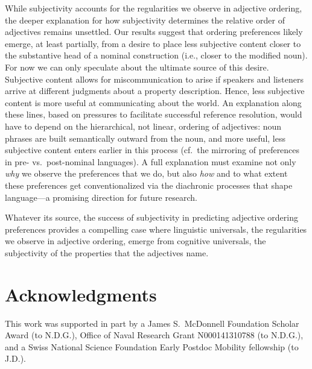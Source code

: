 \documentclass[manuscript]{stjour}
\begin{document}
While subjectivity accounts for the regularities we observe in adjective ordering, the deeper explanation for how subjectivity determines the relative order of adjectives remains unsettled. Our results suggest that ordering preferences likely emerge, at least partially, from a desire to place less subjective content closer to the substantive head of a nominal construction (i.e., closer to the modified noun). 
For now we can only speculate about the ultimate source of this desire. Subjective content allows for miscommunication to arise if speakers and listeners arrive at different judgments about a property description. Hence, less subjective content is more useful at communicating about the world. 
An explanation along these lines, based on pressures to facilitate successful reference resolution, would have to depend on the hierarchical, not linear, ordering of adjectives: noun phrases are built semantically outward from the noun, and more useful, less subjective content enters earlier in this process (cf.~the mirroring of preferences in pre- vs.~post-nominal languages). A full explanation must examine not only \emph{why} we observe the preferences that we do, but also \emph{how} and to what extent these preferences get conventionalized via the diachronic processes that shape language---a promising direction for future research. %

Whatever its source, the success of subjectivity in predicting adjective ordering preferences provides a compelling case where linguistic universals, the regularities we observe in adjective ordering, emerge from cognitive universals, the subjectivity of the properties that the adjectives name.


\section*{Acknowledgments}
This work was supported in part by a James S.~McDonnell Foundation Scholar Award (to N.D.G.), Office of Naval Research Grant N000141310788 (to N.D.G.), and a Swiss National Science Foundation Early Postdoc Mobility fellowship (to J.D.).




\end{document}
